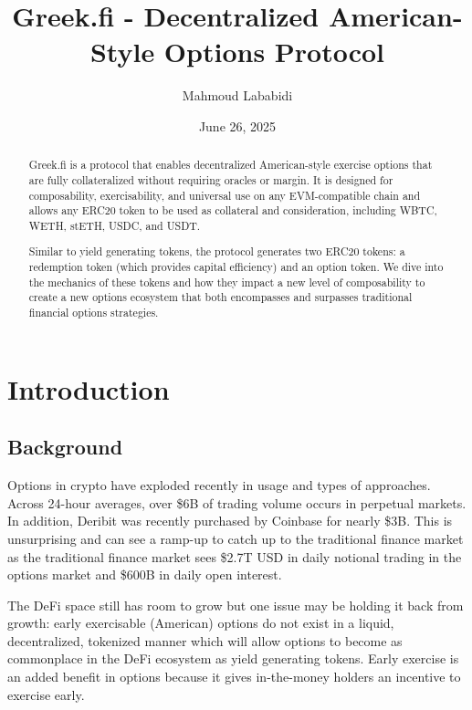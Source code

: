 \documentclass[%
 reprint,
 amsmath,amssymb,
 aps,
]{revtex4-2}
\newcommand{\greekfi}{Greek.fi }
\begin{document}
\title{\greekfi - Decentralized American-Style Options Protocol}

\author{Mahmoud Lababidi}
\affiliation{%
\greekfi 
}

\date{June 26, 2025}

\begin{abstract}
\greekfi is a protocol that enables decentralized American-style exercise options that are fully collateralized without requiring oracles or margin. 
It is designed for composability, exercisability, and universal use on any EVM-compatible chain and allows any ERC20 token to be used as collateral and consideration, including WBTC, WETH, stETH, USDC, and USDT. 

Similar to yield generating tokens, the protocol generates two ERC20 tokens: a redemption token (which provides capital efficiency) and an option token.
We dive into the mechanics of these tokens and how they impact a new level of composability to create a new options ecosystem that both encompasses and surpasses traditional financial options strategies.


\end{abstract}

\maketitle

\section{Introduction}

\subsection{Background}
Options in crypto have exploded recently in usage and types of approaches. 
Across 24-hour averages, over \$6B of trading volume occurs in perpetual markets. 
In addition, Deribit was recently purchased by Coinbase for nearly \$3B. 
This is unsurprising and can see a ramp-up to catch up to the traditional finance market as the traditional finance market sees \$2.7T USD in daily notional trading in the options market and \$600B in daily open interest. 

The DeFi space still has room to grow but one issue may be holding it back from growth: early exercisable (American) options do not exist in a liquid, decentralized, tokenized manner which will allow options to become as commonplace in the DeFi ecosystem as yield generating tokens. 
Early exercise is an added benefit in options because it gives in-the-money holders an incentive to exercise early.
\end{document}

